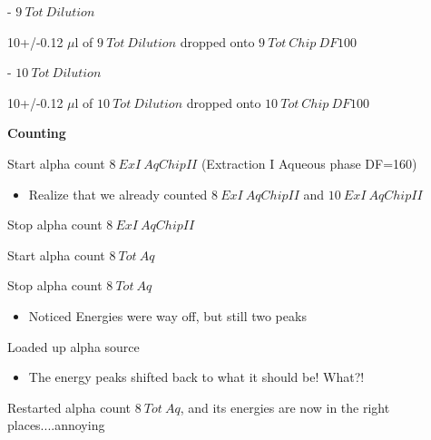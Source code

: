 \documentclass[idxtotoc,hyperref,openany,oneside]{labbook} %
\newcommand{\cmark}{\ding{51}}%
\newcommand{\done}{\rlap{$\square$}{\raisebox{2pt}{\large\hspace{1pt}\cmark}}%
  \hspace{-2.5pt}}
\begin{document}
\begin{todolist}
  \begin{todolist}
  \item[\done]{- $\boxed{9\ Tot\ Dilution}$}
  \end{todolist}
  \vspace{0.3cm}
  \begin{center}
    10+/-0.12 $\mu$l of $\boxed{9\ Tot\ Dilution}$ dropped onto
    $\boxed{9\ Tot\ Chip\ DF100}$
  \end{center}

  \begin{todolist}
  \item[\done]{- $\boxed{10\ Tot\ Dilution}$}
  \end{todolist}
  \vspace{0.3cm}
  \begin{center}
    10+/-0.12 $\mu$l of $\boxed{10\ Tot\ Dilution}$ dropped onto
    $\boxed{10\ Tot\ Chip\ DF100}$
  \end{center}

\end{todolist}


\textbf{Counting}
\begin{todolist}
\item[\done]{Start alpha count $\boxed{8\ ExI\ Aq ChipII}$ (Extraction I Aqueous phase DF=160)}
  \begin{itemize}
  \item{Realize that we already counted $\boxed{8\ ExI\ Aq ChipII}$ and $\boxed{10\ ExI\ Aq ChipII}$}
  \end{itemize}
\item[\done]{Stop alpha count $\boxed{8\ ExI\ Aq ChipII}$}
\item[\done]{Start alpha count $\boxed{8\ Tot\ Aq}$}
\end{todolist}






\begin{todolist}
\item[\done]{Stop alpha count $\boxed{8\ Tot\ Aq}$}
  \begin{itemize}
  \item{Noticed Energies were way off, but still two peaks}
  \end{itemize}
\item[\done]{Loaded up alpha source}
  \begin{itemize}
  \item{The energy peaks shifted back to what it should be! What?!}
  \end{itemize}
\item[\done]{Restarted alpha count $\boxed{8\ Tot\ Aq}$, and its energies are now
  in the right places....annoying}
\end{todolist}
\end{document}
